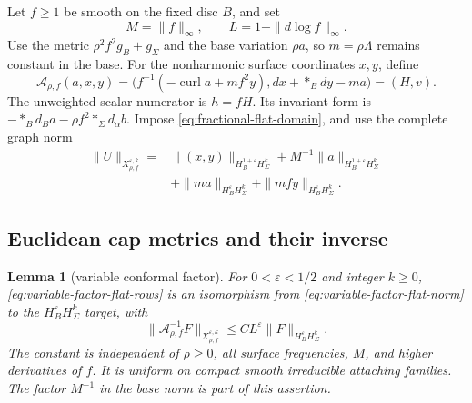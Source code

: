 \documentclass[11pt]{amsart}
\newtheorem{lemma}[theorem]{Lemma}
\theoremstyle{definition}
\theoremstyle{remark}
\theoremstyle{plain}
\begin{document}
Let $f\geq1$ be smooth on the fixed disc $B$, and set
\[
 M=\|f\|_\infty,\qquad L=1+\|d\log f\|_\infty.
\]
Use the metric $\rho^2f^2g_B+g_\Sigma$ and the base variation
$\rho a$, so $m=\rho\Lambda$ remains constant in the base.
For the nonharmonic surface coordinates $x,y$, define
\begin{equation}\label{eq:variable-factor-flat-rows}
 \mathcal A_{\rho,f}(a,x,y)
 =\bigl(f^{-1}(-\operatorname{curl}a+mf^2y),
                         dx+*_Bdy-ma\bigr)=(H,v).
\end{equation}
The unweighted scalar numerator is $h=fH$. Its invariant form is
$-*_Bd_Ba-\rho f^2 *_\Sigma d_\alpha b$. Impose
\eqref{eq:fractional-flat-domain}, and use the complete graph norm
\begin{equation}\label{eq:variable-factor-flat-norm}
 \begin{split}
 \|U\|_{X_{\rho,f}^{\varepsilon,k}}={}&
 \|(x,y)\|_{H_B^{1+\varepsilon}H_\Sigma^k}
 +M^{-1}\|a\|_{H_B^{1+\varepsilon}H_\Sigma^k}\\
 &+\|ma\|_{H_B^\varepsilon H_\Sigma^k}
 +\|mf y\|_{H_B^\varepsilon H_\Sigma^k}.
 \end{split}
\end{equation}

\subsection{Euclidean cap metrics and their inverse}
\begin{lemma}[variable conformal factor]\label{lem:variable-factor-inverse}
For $0<\varepsilon<1/2$ and integer $k\geq0$,
\eqref{eq:variable-factor-flat-rows} is an isomorphism from
\eqref{eq:variable-factor-flat-norm} to the $H_B^\varepsilon
H_\Sigma^k$ target, with
\begin{equation}\label{eq:variable-factor-estimate}
 \|\mathcal A_{\rho,f}^{-1}F\|_{X_{\rho,f}^{\varepsilon,k}}
                    \leq C L^\varepsilon\|F\|_{H_B^\varepsilon H_\Sigma^k}.
\end{equation}
The constant is independent of $\rho\geq0$, all surface
frequencies, $M$, and higher derivatives of $f$. It is uniform
on compact smooth irreducible attaching families. The factor
$M^{-1}$ in the base norm is part of this assertion.
\end{lemma}
\end{document}
